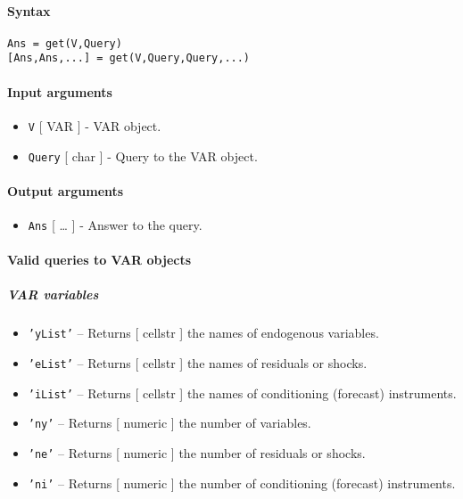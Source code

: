 


	\paragraph{Syntax}

\begin{verbatim}
Ans = get(V,Query)
[Ans,Ans,...] = get(V,Query,Query,...)
\end{verbatim}

\paragraph{Input arguments}

\begin{itemize}
\item
  \texttt{V} {[} VAR {]} - VAR object.
\item
  \texttt{Query} {[} char {]} - Query to the VAR object.
\end{itemize}

\paragraph{Output arguments}

\begin{itemize}
\itemsep1pt\parskip0pt
\item
  \texttt{Ans} {[} \ldots{} {]} - Answer to the query.
\end{itemize}

\paragraph{Valid queries to VAR
objects}

\subparagraph{VAR variables}

\begin{itemize}
\item
  \texttt{'yList'} -- Returns {[} cellstr {]} the names of endogenous
  variables.
\item
  \texttt{'eList'} -- Returns {[} cellstr {]} the names of residuals or
  shocks.
\item
  \texttt{'iList'} -- Returns {[} cellstr {]} the names of conditioning
  (forecast) instruments.
\item
  \texttt{'ny'} -- Returns {[} numeric {]} the number of variables.
\item
  \texttt{'ne'} -- Returns {[} numeric {]} the number of residuals or
  shocks.
\item
  \texttt{'ni'} -- Returns {[} numeric {]} the number of conditioning
  (forecast) instruments.
\end{itemize}

